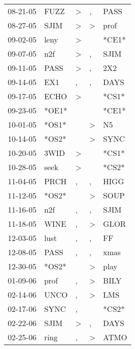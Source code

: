 \begin{supertabular}{lllll}
 08-21-05 &   FUZZ &     \textgreater &                , &   PASS \\
 08-27-05 &   SJIM &     \textgreater &     \textgreater &   prof \\
 09-02-05 &   leny &     \textgreater &                  &  *CE1* \\
 09-07-05 &    n2f &     \textgreater &                , &   SJIM \\
 09-11-05 &   PASS &     \textgreater &                , &    2X2 \\
 09-14-05 &    EX1 &                , &                , &   DAYS \\
 09-17-05 &   ECHO &     \textgreater &                  &  *CS1* \\
 09-23-05 &  *OE1* &                  &                  &  *CE1* \\
 10-01-05 &  *OS1* &                  &     \textgreater &     N5 \\
 10-14-05 &  *OS2* &                  &     \textgreater &   SYNC \\
 10-20-05 &   3WID &     \textgreater &                  &  *CS1* \\
 10-28-05 &   seek &     \textgreater &                  &  *CS2* \\
 11-04-05 &   PRCH &                , &                , &   HIGG \\
 11-12-05 &  *OS2* &                  &     \textgreater &   SOUP \\
 11-16-05 &    n2f &                , &                , &   SJIM \\
 11-18-05 &   WINE &                , &     \textgreater &   GLOR \\
 12-03-05 &   lust &                , &                , &     FF \\
 12-08-05 &   PASS &                , &                , &   xmas \\
 12-30-05 &  *OS2* &                  &     \textgreater &   play \\
 01-09-06 &   prof &                , &     \textgreater &   BILY \\
 02-14-06 &   UNCO &                , &     \textgreater &    LMS \\
 02-17-06 &   SYNC &                , &                  &  *CS2* \\
 02-22-06 &   SJIM &     \textgreater &                , &   DAYS \\
 02-25-06 &   ring &                , &     \textgreater &   ATMO \\

\end{supertabular}
